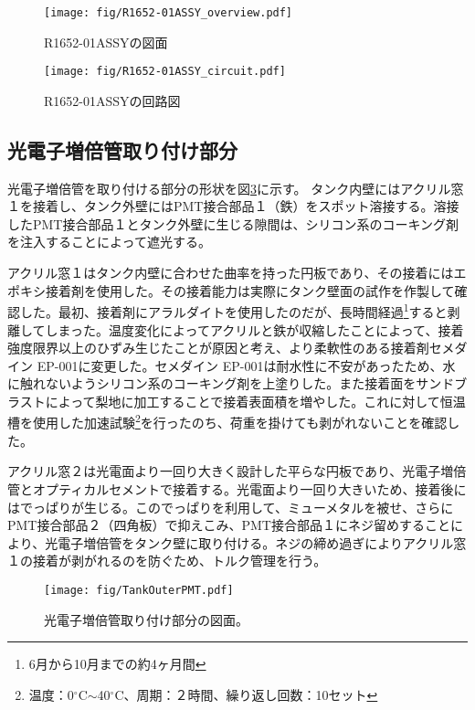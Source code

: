 \documentclass[11pt]{ltjsreport}
\newcommand{\figref}[1]{図\ref{#1}}
\begin{document}
\begin{figure}[htbp]
\centering
\texttt{[image: fig/R1652-01ASSY\_overview.pdf]}
\caption[R1652-01ASSYの寸法]{R1652-01ASSYの図面}
\label{LGPMT}
\end{figure}

\begin{figure}[htbp]
\centering
\texttt{[image: fig/R1652-01ASSY\_circuit.pdf]}
\caption[R1652-01ASSYの回路図]{R1652-01ASSYの回路図}
\label{LGPMTciruit}
\end{figure}
\fi


\subsection{光電子増倍管取り付け部分}

光電子増倍管を取り付ける部分の形状を\figref{SetPMT}に示す。
タンク内壁にはアクリル窓１を接着し、タンク外壁にはPMT接合部品１（鉄）をスポット溶接する。溶接したPMT接合部品１とタンク外壁に生じる隙間は、シリコン系のコーキング剤を注入することによって遮光する。

アクリル窓１はタンク内壁に合わせた曲率を持った円板であり、その接着にはエポキシ接着剤を使用した。その接着能力は実際にタンク壁面の試作を作製して確認した。最初、接着剤にアラルダイトを使用したのだが、長時間経過\footnote{6月から10月までの約4ヶ月間}すると剥離してしまった。温度変化によってアクリルと鉄が収縮したことによって、接着強度限界以上のひずみ生じたことが原因と考え、より柔軟性のある接着剤セメダイン EP-001に変更した。セメダイン EP-001は耐水性に不安があったため、水に触れないようシリコン系のコーキング剤を上塗りした。また接着面をサンドブラストによって梨地に加工することで接着表面積を増やした。これに対して恒温槽を使用した加速試験\footnote{温度：0$^{\circ}$C$\sim$40$^{\circ}$C、周期：２時間、繰り返し回数：10セット}を行ったのち、荷重を掛けても剥がれないことを確認した。

アクリル窓２は光電面より一回り大きく設計した平らな円板であり、光電子増倍管とオプティカルセメントで接着する。光電面より一回り大きいため、接着後にはでっぱりが生じる。このでっぱりを利用して、ミューメタルを被せ、さらにPMT接合部品２（四角板）で抑えこみ、PMT接合部品１にネジ留めすることにより、光電子増倍管をタンク壁に取り付ける。ネジの締め過ぎによりアクリル窓１の接着が剥がれるのを防ぐため、トルク管理を行う。



\begin{figure}[!h]
\centering
\texttt{[image: fig/TankOuterPMT.pdf]}
\caption[光電子増倍管取り付け部分の図面]{光電子増倍管取り付け部分の図面。}
\label{SetPMT}
\end{figure}
\end{document}
